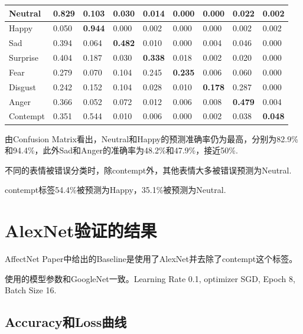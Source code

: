 \documentclass[11pt, a4paper]{article}
\begin{document}
\begin{CJK}{UTF8}{gbsn}
\begin{table}[htbp]
\begin{center}
\begin{tabular}{ | l | l | l | l | l |l | l |l | l | }
			Neutral  & \textbf{0.829}  &  0.103  &  0.030  &  0.014  &  0.000  &  0.000  &  0.022  &  0.002 \\ \hline
			
			Happy   & 0.050  &  \textbf{0.944}  &  0.000  &  0.002  &  0.000  &  0.000  &  0.002  &  0.002 \\ \hline
			
			Sad    & 0.394  &  0.064  &  \textbf{0.482}  &  0.010  &  0.000  &  0.004  &  0.046  &  0.000  \\ \hline
			
			Surprise    &  0.404  &  0.187  &  0.030  &  \textbf{0.338}  &  0.018  &  0.002  &  0.020  &  0.000 \\ \hline
			
			Fear     &  0.279  &  0.070  &  0.104  &  0.245  &  \textbf{0.235}  &  0.006  &  0.060  &  0.000 \\ \hline
			
			Disgust      &   0.242  &  0.152  &  0.104  &  0.028  &  0.010  &  \textbf{0.178}  &  0.287  &  0.000 \\ \hline
			
			Anger       &  0.366  &  0.052  &  0.072  &  0.012  &  0.006  &  0.008  &  \textbf{0.479}  &  0.004 \\ \hline
			
			Contempt   & 0.351  &  0.544  &  0.010  &  0.006  &  0.000  &  0.002  &  0.038  &  \textbf{0.048} \\ \hline
		\end{tabular}
		\label{tab:res18_cm}
	\end{center}
\end{table}	

由Confusion Matrix看出，Neutral和Happy的预测准确率仍为最高，分别为82.9\%和94.4\%，此外Sad和Anger的准确率为48.2\%和47.9\%，接近50\%.

不同的表情被错误分类时，除contempt外，其他表情大多被错误预测为Neutral.

contempt标签54.4\%被预测为Happy，35.1\%被预测为Neutral.

\section{AlexNet验证的结果}

AffectNet Paper中给出的Baseline是使用了AlexNet并去除了contempt这个标签。

使用的模型参数和GoogleNet一致。Learning Rate 0.1, optimizer SGD, Epoch 8, Batch Size 16.

\subsection{Accuracy和Loss曲线}


\end{CJK}
\end{document}
